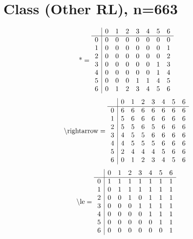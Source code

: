 \documentclass[11pt]{article}
\begin{document}
\section{Class (Other RL), n=663}
\[\text{*} = 
\begin{array}{r | r r r r r r r}
 & 0 & 1 & 2 & 3 & 4 & 5 & 6 \\ \hline
0 & 0 & 0 & 0 & 0 & 0 & 0 & 0 \\
1 & 0 & 0 & 0 & 0 & 0 & 0 & 1 \\
2 & 0 & 0 & 0 & 0 & 0 & 0 & 2 \\
3 & 0 & 0 & 0 & 0 & 0 & 1 & 3 \\
4 & 0 & 0 & 0 & 0 & 0 & 1 & 4 \\
5 & 0 & 0 & 0 & 1 & 1 & 4 & 5 \\
6 & 0 & 1 & 2 & 3 & 4 & 5 & 6 \\
\end{array}
\]
\[\text{\textbackslash rightarrow} = 
\begin{array}{r | r r r r r r r}
 & 0 & 1 & 2 & 3 & 4 & 5 & 6 \\ \hline
0 & 6 & 6 & 6 & 6 & 6 & 6 & 6 \\
1 & 5 & 6 & 6 & 6 & 6 & 6 & 6 \\
2 & 5 & 5 & 6 & 5 & 6 & 6 & 6 \\
3 & 4 & 5 & 5 & 6 & 6 & 6 & 6 \\
4 & 4 & 5 & 5 & 5 & 6 & 6 & 6 \\
5 & 2 & 4 & 4 & 4 & 5 & 6 & 6 \\
6 & 0 & 1 & 2 & 3 & 4 & 5 & 6 \\
\end{array}
\]
\[\text{\textbackslash le} = 
\begin{array}{r | r r r r r r r}
 & 0 & 1 & 2 & 3 & 4 & 5 & 6 \\ \hline
0 & 1 & 1 & 1 & 1 & 1 & 1 & 1 \\
1 & 0 & 1 & 1 & 1 & 1 & 1 & 1 \\
2 & 0 & 0 & 1 & 0 & 1 & 1 & 1 \\
3 & 0 & 0 & 0 & 1 & 1 & 1 & 1 \\
4 & 0 & 0 & 0 & 0 & 1 & 1 & 1 \\
5 & 0 & 0 & 0 & 0 & 0 & 1 & 1 \\
6 & 0 & 0 & 0 & 0 & 0 & 0 & 1 \\
\end{array}
\]
\end{document}
